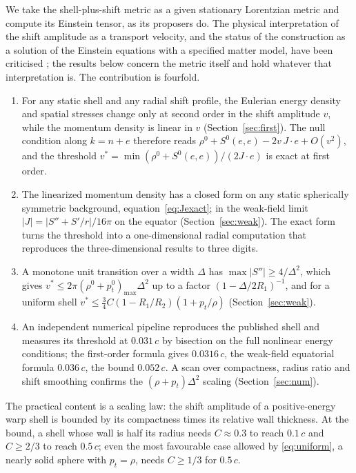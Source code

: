 \documentclass[11pt,a4paper]{article}
\theoremstyle{remark}
\begin{document}
We take the shell-plus-shift metric as a given stationary Lorentzian metric and compute its Einstein tensor, as its proposers do. The physical interpretation of the shift amplitude as a transport velocity, and the status of the construction as a solution of the Einstein equations with a specified matter model, have been criticised \cite{Barzegar2026}; the results below concern the metric itself and hold whatever that interpretation is. The contribution is fourfold.
\begin{enumerate}
\item For any static shell and any radial shift profile, the Eulerian energy density and spatial stresses change only at second order in the shift amplitude $v$, while the momentum density is linear in $v$ (Section~\ref{sec:first}). The null condition along $k = n + e$ therefore reads $\rho^0 + S^0(e,e) - 2v\,J\cdot e + O(v^2)$, and the threshold $v^* = \min(\rho^0 + S^0(e,e))/(2J\cdot e)$ is exact at first order.
\item The linearized momentum density has a closed form on any static spherically symmetric background, equation~\eqref{eq:Jexact}; in the weak-field limit $|J| = |S''+S'/r|/16\pi$ on the equator (Section~\ref{sec:weak}). The exact form turns the threshold into a one-dimensional radial computation that reproduces the three-dimensional results to three digits.
\item A monotone unit transition over a width $\Delta$ has $\max|S''| \ge 4/\Delta^2$, which gives $v^* \le 2\pi(\rho^0+p_t^0)_{\max}\Delta^2$ up to a factor $(1-\Delta/2R_1)^{-1}$, and for a uniform shell $v^* \le \tfrac34 C(1-R_1/R_2)(1+p_t/\rho)$ (Section~\ref{sec:weak}).
\item An independent numerical pipeline reproduces the published shell and measures its threshold at $0.031\,c$ by bisection on the full nonlinear energy conditions; the first-order formula gives $0.0316\,c$, the weak-field equatorial formula $0.036\,c$, the bound $0.052\,c$. A scan over compactness, radius ratio and shift smoothing confirms the $(\rho+p_t)\Delta^2$ scaling (Section~\ref{sec:num}).
\end{enumerate}

The practical content is a scaling law: the shift amplitude of a positive-energy warp shell is bounded by its compactness times its relative wall thickness. At the bound, a shell whose wall is half its radius needs $C \approx 0.3$ to reach $0.1\,c$ and $C \ge 2/3$ to reach $0.5\,c$; even the most favourable case allowed by \eqref{eq:uniform}, a nearly solid sphere with $p_t = \rho$, needs $C \ge 1/3$ for $0.5\,c$.
\end{document}

